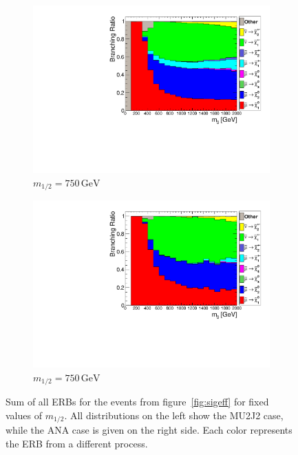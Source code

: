 \begin{figure}[ht!]
  \begin{subfigure}[b]{0.495\textwidth}
    \centering
    \includegraphics[width=\textwidth]{plots/hCrossRatio750.pdf}
    \caption{$m_{1/2} = 750\,\text{GeV}$\label{fig:crossratio750}}
  \end{subfigure}
  \begin{subfigure}[b]{0.495\textwidth}
    \centering
    \includegraphics[width=\textwidth]{plots/hCutCrossRatio750.pdf}
    \caption{$m_{1/2} = 750\,\text{GeV}$\label{fig:cutcrossratio750}}
  \end{subfigure}

  \caption{Sum of all ERBs for the events from figure~\ref{fig:sigeff} for fixed values of $m_{1/2}$. All distributions on the left show the MU2J2 case, while the ANA case is given on the right side. Each color represents the ERB from a different process.}
  \label{fig:crossratios}
\end{figure}

